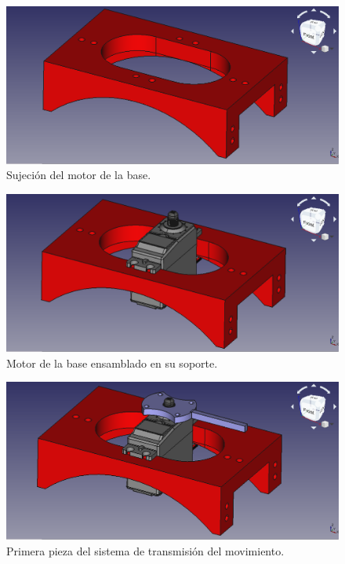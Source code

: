 \begin{figure}[H]
    \centering 
    \includegraphics[width=1\linewidth]{pictures/MotorHold.png}
    \caption{Sujeción del motor de la base.}
    \label{fig:sujección_motor_base}
\end{figure}

\begin{figure}[H]
    \centering 
    \includegraphics[width=1\linewidth]{pictures/MotorHoldYMotor.png}
    \caption{Motor de la base ensamblado en su soporte.}
    \label{fig:motor_ensamblado_soporte}
\end{figure}

\begin{figure}[H]
    \centering 
    \includegraphics[width=1\linewidth]{pictures/MotorMasPrimeraPieza.png}
    \caption{Primera pieza del sistema de transmisión del movimiento.}
    \label{fig:primera_pieza_sistema_transmision}
\end{figure}

